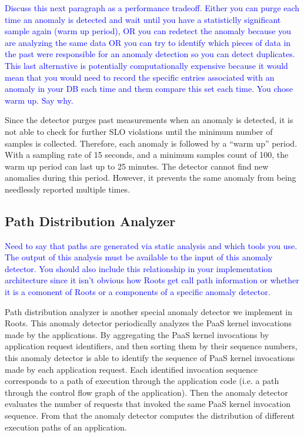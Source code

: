 \textcolor{blue}{Discuss this next paragraph as a performance tradeoff.  
Either you can purge each time an anomaly is detected and wait until you have
a statisticlly significant sample again (warm up period), OR you can redetect
the anomaly because you are analyzing the same data OR you can try to identify
which pieces of data in the past were responsible for an anomaly detection so
you can detect duplicates.  This last alternative is potentially
computationally expensive because it would mean that you would need to record
the specific entries associated with an anomaly in your DB each time and them
compare this set each time.  You chose warm up.  Say why.}
 
Since the detector purges past measurements when an anomaly is detected, it is not able to
check for further SLO violations until the minimum number of samples is collected. Therefore,
each anomaly is followed by a ``warm up'' period. With a sampling rate of 15 seconds, and a minimum
samples count of 100, the warm up period can last up to 25 minutes. The detector cannot find new
anomalies during this period. However, it prevents the same anomaly from being needlessly
reported multiple times.

\subsection{Path Distribution Analyzer}

\textcolor{blue}{Need to say that paths are generated via static analysis and
which tools you use.  The output of this analysis must be available to the
input of this anomaly detector.  You should also include this relationship in
your implementation architecture since it isn't obvious how Roots get call
path information or whether it is a comonent of Roots or a components of a
specific anomaly detector.}

Path distribution analyzer is another special anomaly detector we implement in Roots. This
anomaly detector periodically analyzes the PaaS kernel invocations made by the applications.
By aggregating the PaaS kernel invocations by application request identifiers, and then sorting them by
their sequence numbers, this anomaly detector is able to identify the sequence of
PaaS kernel invocations made by each application request. 
Each identified invocation sequence corresponds to a path of
execution through the application code (i.e. a path through the control flow graph of the application). 
Then the anomaly detector evaluates the number of requests
that invoked the same PaaS kernel invocation sequence. From that the anomaly detector
computes the distribution of different execution paths of an application.

